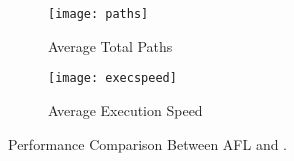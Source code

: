 

\begin{figure}[htbp]
\centering

\begin{subfigure}[b]{0.48\textwidth}
       \texttt{[image: paths]}
        \caption{Average Total Paths}
    \end{subfigure}%
\vspace{5pt}
\begin{subfigure}[b]{0.48\textwidth}
        \texttt{[image: execspeed]}
        \caption{Average Execution Speed}
    \end{subfigure}%

\caption{Performance Comparison Between AFL and \sysname.}
\label{figs:performance}
\end{figure}

